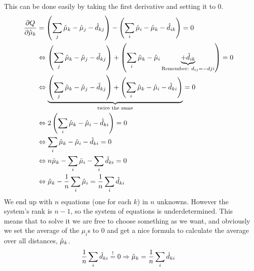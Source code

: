 \documentclass[../main/Notes.tex]{subfiles}
\begin{document}
This can be done easily by taking the first derivative and setting it to 0.
\begin{align*}
\frac{\partial Q}{\partial \est{\mu_k}} &=             \left( \sum\limits_j \est{\mu_k} - \est{\mu_j} - \est{d_{kj}} \right) - \left( \sum\limits_i \est{\mu_i} - \est{\mu_k}              - \est{d_{ik}} \right) = 0\\
                          &\Leftrightarrow             \left( \sum\limits_j \est{\mu_k} - \est{\mu_j} - \est{d_{kj}} \right) + \left( \sum\limits_i \est{\mu_k} - \est{\mu_i} \underbrace{ + \est{d_{ik}} }_{\text{Remember: }d_{ij}=-d{ji}} \right) = 0\\
                          &\Leftrightarrow \underbrace{\left( \sum\limits_j \est{\mu_k} - \est{\mu_j} - \est{d_{kj}} \right) + \left( \sum\limits_i \est{\mu_k} - \est{\mu_i}              - \est{d_{ki}} \right)}_{\text{twice the same}} = 0\\
                          &\Leftrightarrow           2 \left( \sum\limits_i \est{\mu_k} - \est{\mu_i} - \est{d_{ki}} \right) = 0\\
                          &\Leftrightarrow                    \sum\limits_i \est{\mu_k} - \est{\mu_i} - \est{d_{ki}}         = 0\\
                          &\Leftrightarrow    n \est{\mu_k} -            \sum\limits_i \est{\mu_i} -            \sum\limits_i \est{d_{ki}} = 0 \\
                          &\Leftrightarrow      \est{\mu_k} - \frac{1}{n}\sum\limits_i \est{\mu_i} = \frac{1}{n}\sum\limits_i \est{d_{ki}}
\end{align*}
We end up with $n$ equations (one for each $k$) in $n$ unknowns. However the system's rank is $n-1$, so the system of equations is underdetermined. This means that to solve it we are free to choose something as we want, and obviously we set the average of the $\mu_i$s to 0 and get a nice formula to calculate the average over all distances, $\est{\mu_k}$.
\begin{align*}
\frac{1}{n} \sum\limits_i \est{d_{ki}} \stackrel{!}{=} 0 \Rightarrow \est{\mu_k} = \frac{1}{n} \sum\limits_i \est{d_{ki}}
\end{align*}
\end{document}
